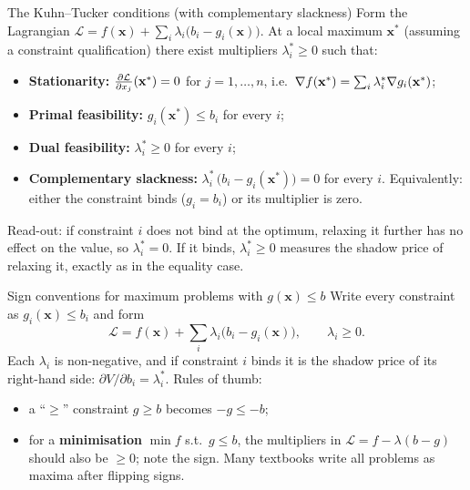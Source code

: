 \begin{rulebox}{The Kuhn--Tucker conditions (with complementary slackness)}
Form the Lagrangian
$\mathcal{L} = f(\mathbf{x}) + \sum_i \lambda_i\bigl(b_i - g_i(\mathbf{x})\bigr)$.
At a local maximum $\mathbf{x}^*$ (assuming a constraint qualification)
there exist multipliers $\lambda_i^* \geq 0$ such that:
\begin{itemize}[leftmargin=1.6em,itemsep=0.3ex]
  \item \textbf{Stationarity:} $\frac{\partial \mathcal{L}}{\partial x_j}(\mathbf{x}^*) = 0$
        for $j = 1, \dots, n$, i.e.\
        $\nabla f(\mathbf{x}^*) = \sum_i \lambda_i^* \nabla g_i(\mathbf{x}^*)$;
  \item \textbf{Primal feasibility:} $g_i(\mathbf{x}^*) \leq b_i$ for every
        $i$;
  \item \textbf{Dual feasibility:} $\lambda_i^* \geq 0$ for every $i$;
  \item \textbf{Complementary slackness:}
        $\lambda_i^*\,\bigl(b_i - g_i(\mathbf{x}^*)\bigr) = 0$ for every
        $i$. Equivalently: either the constraint binds ($g_i = b_i$) or its
        multiplier is zero.
\end{itemize}
Read-out: if constraint $i$ does not bind at the optimum, relaxing it
further has no effect on the value, so $\lambda_i^* = 0$. If it binds,
$\lambda_i^* \geq 0$ measures the shadow price of relaxing it, exactly as
in the equality case.
\end{rulebox}

\begin{rulebox}{Sign conventions for maximum problems with $g(\mathbf{x}) \leq b$}
Write every constraint as $g_i(\mathbf{x}) \leq b_i$ and form
\[
  \mathcal{L} = f(\mathbf{x})
  + \sum_i \lambda_i\bigl(b_i - g_i(\mathbf{x})\bigr),
  \qquad \lambda_i \geq 0 .
\]
Each $\lambda_i$ is non-negative, and if constraint $i$ binds it is the
shadow price of its right-hand side: $\partial V/\partial b_i = \lambda_i^*$.
Rules of thumb:
\begin{itemize}[leftmargin=1.6em,itemsep=0.3ex]
  \item a ``$\geq$'' constraint $g \geq b$ becomes $-g \leq -b$;
  \item for a \textbf{minimisation} $\min f$ s.t.\ $g \leq b$, the
        multipliers in $\mathcal{L} = f - \lambda(b - g)$ should also be
        $\geq 0$; note the sign. Many textbooks write all problems
        as maxima after flipping signs.
\end{itemize}
\end{rulebox}

